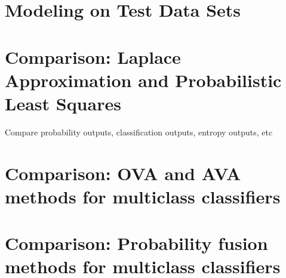 %		
%				
				
	\section{Modeling on Test Data Sets}
	
	\section{Comparison: Laplace Approximation and Probabilistic Least Squares}
	
		Compare probability outputs, classification outputs, entropy outputs, etc
	
	\section{Comparison: OVA and AVA methods for multiclass classifiers}
	
	\section{Comparison: Probability fusion methods for multiclass classifiers}
	
%			
%			
			
